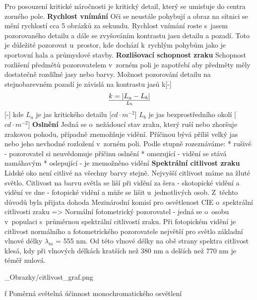 Pro posouzení kritické náročnosti je kritický detail, který se umisťuje do centra zorného pole.
\medskip
{\bf Rychlost vnímání}
\medskip
Oči se neustále pohybují a obraz na sítnici se mění rychlostí cca 5 obrázků za sekundu. Rychlost vnímání roste s~jasem
pozorovaného detailu a dále se zvyšováním kontrastu jasu detailu a pozadí. Toto je důležité pozorovat u~prostor, kde
dochází k~rychlým pohybům jako je sportovní hala a průmyslové stavby.
{\bf Rozlišovací schopnost zraku}
\medskip
Schopnost rozlišení předmětů pozorovatelem v~zorném poli je zapotřebí aby předměty měly dostatečně rozdílné jasy
nebo barvy. Možnost pozorování detailu na stejnobarevném pozadí je závislá na kontrastu jasů k[-]
$$k={|L_a-L_b|}\over L_b$$ [-]
kde  $L_a$ je jas kritického detailu [$cd \cdot m^{-2}$]
\medskip
$L_b$ je jas bezprostředního okolí [$cd \cdot m^{-2}$]
\medskip
{\bf Oslnění}
\medskip
Jedná se o~nežádoucí stav zraku, který ruší nebo zhoršuje zrakovou pohodu, případně znemožňuje vidění.
Příčinou bývá příliš velký jas nebo jeho nevhodné rozložení v~zorném poli.
Podle stupně rozeznáváme:
\medskip
\begitems
* rušivé - pozorovatel si neuvědomuje příčinu oslnění
* omezující - vidění se stává namáhavým
* oslepující - je znemožněno vidění
\enditems
\medskip
{\bf Spektrální citlivost zraku}
\medskip
Lidské oko není citlivé na všechny barvy stejně. Nejvyšší citlivost máme na žluté světlo. Citlivost na barvu
světla se liší při vidění za šera - skotopické vidění a vidění ve dne - fotopické vidění a může se lišit
u~jednotlivých osob. Z~těchto důvodů byla přijata dohoda Mezinárodní komisí pro osvětlenost CIE o~spektrální
citlivosti zraku => {\sbf Normální fotometrický pozorovatel} - jedná se o~osobu v~populaci s~průměrnou
spektrální citlivostí zraku. Při fotopickém vidění je citlivost normálního a fotometrického pozorovatele
největší pro světlo základní vlnové délky $λ_m$ = 555 nm. Od této vlnové délky na obě strany spektra
citlivost klesá, kdy při vlnových délkách kratších než 380 nm a delších než 770 nm je téměř nulová.
\medskip

\medskip {}
\picw=12cm _Obrazky/citlivost_graf.png
\caption/f Poměrná světelná účinnost monochromatického osvětlení



